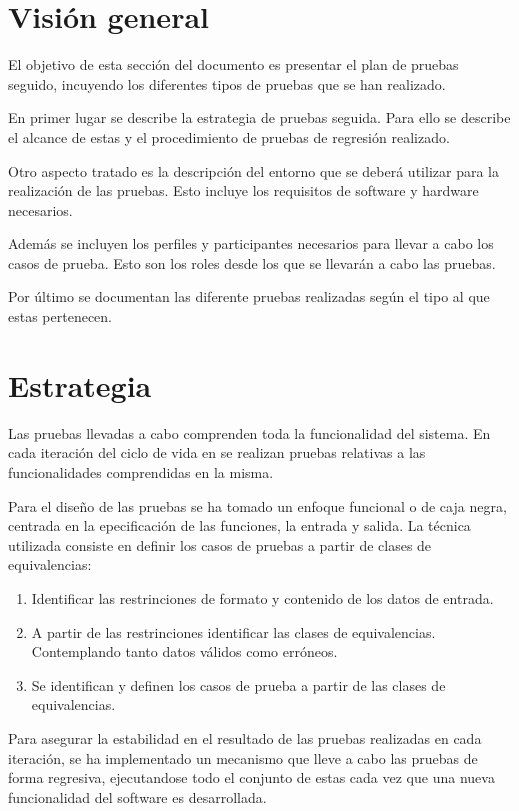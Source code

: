  \section {Visión general}
El objetivo de esta sección del documento es presentar el plan de pruebas seguido, 
incuyendo los diferentes tipos de pruebas que se han realizado. 

En primer lugar se describe la estrategia de pruebas seguida. Para ello se describe 
el alcance de estas y el procedimiento de pruebas de regresión realizado. 

Otro aspecto tratado es la descripción del entorno que se deberá utilizar para la
realización de las pruebas. Esto incluye los requisitos de software y hardware necesarios. 

Además se incluyen los perfiles y participantes necesarios para llevar a cabo los casos 
de prueba. Esto son los roles desde los que se llevarán a cabo las pruebas.

Por último se documentan las diferente pruebas realizadas según el tipo al que estas pertenecen.

\section{Estrategia}
Las pruebas llevadas a cabo comprenden toda la funcionalidad del sistema. En cada iteración del ciclo de
vida en se realizan pruebas relativas a las funcionalidades comprendidas en la misma. 

Para el diseño de las pruebas se ha tomado un enfoque funcional o de caja negra, centrada en la 
epecificación de las funciones, la entrada y salida. La técnica utilizada consiste en definir 
los casos de pruebas a partir de clases de equivalencias:

\begin{enumerate}
\item Identificar las restrinciones de formato y contenido de los datos de entrada.
\item A partir de las restrinciones identificar las clases de equivalencias. Contemplando tanto 
datos válidos como erróneos.
\item Se identifican y definen los casos de prueba a partir de las clases de equivalencias.
\end{enumerate}

Para asegurar la estabilidad en el resultado de las pruebas realizadas en cada iteración, se ha implementado un mecanismo
que lleve a cabo las pruebas de forma regresiva, ejecutandose todo el conjunto de estas cada vez que una nueva funcionalidad 
del software es desarrollada. 


